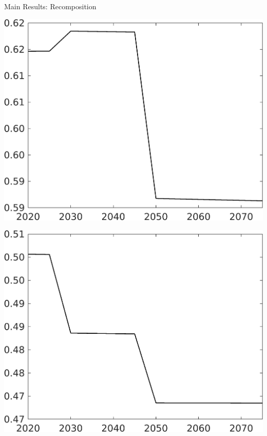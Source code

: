 \documentclass[11pt,aspectratio=169]{beamer}
\begin{document}
\begin{frame}{Main Results: Recomposition}
\begin{minipage}[]{0.32\textwidth}
	\includegraphics[width=1\textwidth]{../codding_model/own_basedOnFried/optimalPol_elastS_DisuSci/figures/all_1705/Single_OPT_T_NoTaus_CY_spillover0_sep1_BN0_ineq0_red0_etaa0.79.png}
\end{minipage}
\begin{minipage}[]{0.32\textwidth}
	\includegraphics[width=1\textwidth]{../codding_model/own_basedOnFried/optimalPol_elastS_DisuSci/figures/all_1705/Single_OPT_T_NoTaus_EY_spillover0_sep1_BN0_ineq0_red0_etaa0.79.png}
\end{minipage}
\end{frame}
\end{document}
